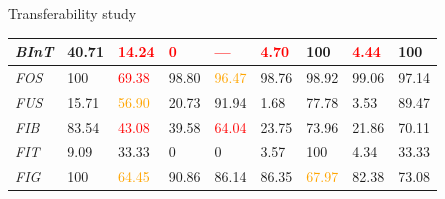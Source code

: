 \documentclass[10pt, export]{beamer}
\begin{document}
\begin{frame}{Transferability study}
\begin{table}
\begin{center}
\begin{tabular}{|x{.75cm} | x{.75cm} x{.75cm} | x{.75cm} x{.75cm} || x{.75cm} x{.75cm}| x{.75cm} x{.75cm}|}
                        \hline
                        \textit{BInT} & \textcolor{IGNDarkGreen}{40.71} & \textcolor{red}{14.24} & \textcolor{red}{0} & \textcolor{red}{---}  & \textcolor{red}{4.70} & 100 & \textcolor{red}{4.44} & 100 \\
                        \hline
                        \hline
                        \textit{FOS} & \textcolor{IGNDarkGreen}{100} & \textcolor{red}{69.38} & \textcolor{IGNDarkGreen}{98.80} & \textcolor{orange}{96.47} & \textcolor{IGNDarkGreen}{98.76} & \textcolor{IGNDarkGreen}{98.92} & \textcolor{IGNDarkGreen}{99.06} & \textcolor{IGNDarkGreen}{97.14} \\
                        \hline
                        \textit{FUS} & \textcolor{IGNDarkGreen}{15.71} & \textcolor{orange}{56.90} & \textcolor{IGNDarkGreen}{20.73} & \textcolor{IGNDarkGreen}{91.94} & 1.68 & 77.78 & 3.53 & 89.47 \\
                        \hline
                        \textit{FIB} & \textcolor{IGNDarkGreen}{83.54} & \textcolor{red}{43.08} & \textcolor{IGNDarkGreen}{39.58} & \textcolor{red}{64.04} & \textcolor{IGNDarkGreen}{23.75} & 73.96 & \textcolor{IGNDarkGreen}{21.86} & 70.11 \\
                        \hline
                        \textit{FIT} & 9.09 & 33.33 & 0 & 0 & 3.57 & 100 & 4.34 & 33.33 \\
                        \hline
                        \textit{FIG} & \textcolor{IGNDarkGreen}{100} & \textcolor{orange}{64.45} & \textcolor{IGNDarkGreen}{90.86} & \textcolor{IGNDarkGreen}{86.14} & \textcolor{IGNDarkGreen}{86.35} & \textcolor{orange}{67.97} & \textcolor{IGNDarkGreen}{82.38} & \textcolor{IGNDarkGreen}{73.08} \\
                        \hline
                    \end{tabular}
                \end{center}
            \end{table}            
        \end{frame}
\end{document}
